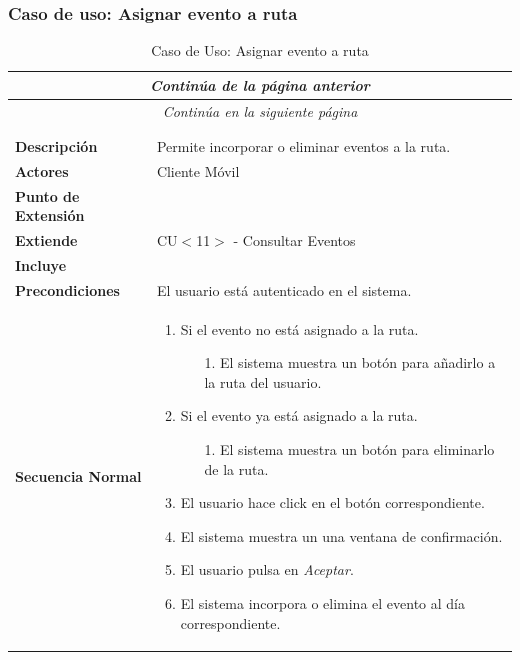 \newpage
\subsubsection*{Caso de uso: Asignar evento a ruta }
\begin{longtable}{| p{4cm} | p{10cm} |}
\endfirsthead
\multicolumn{2}{c}{\textit{Continúa de la página anterior}}\\[12pt]
\hline
\endhead
\hline
\multicolumn{2}{c}{\textit{Continúa en la siguiente página}} \\
\endfoot
\hline
\caption{Caso de Uso: Asignar evento a ruta}\label{fig:1}\\
\endlastfoot


\hline
\multicolumn{2}{|c|}{\textbf{CU$<$13$>$ - Asignar Evento a ruta}} \\

\hline
\textbf{Descripción} &
Permite incorporar o eliminar eventos a la ruta.\\

\hline
\textbf{Actores} &
Cliente Móvil\\

\hline
\textbf{Punto de Extensión} &
\\

\hline
\textbf{Extiende} &
CU$<$11$>$ - Consultar Eventos
\\

\hline
\textbf{Incluye} &
\\

\hline
\textbf{Precondiciones} &
El usuario está autenticado en el sistema.\\

\hline
\textbf{Secuencia Normal} &\mbox{}\par\vspace{-\baselineskip}
\begin{enumerate}[leftmargin=0.7cm, topsep=0.1cm]
\item Si el evento no está asignado a la ruta.
	\begin{itemize}
	\item[1.] El sistema muestra un botón para añadirlo a la ruta del usuario.
	\end{itemize}
\item Si el evento ya está asignado a la ruta.
	\begin{itemize}
	\item[1.] El sistema muestra un botón para eliminarlo de la ruta.
	\end{itemize}
\item El usuario hace click en el botón correspondiente.
\item El sistema muestra un una ventana de confirmación.
\item El usuario pulsa en \textit{Aceptar}.
\item El sistema incorpora o elimina el evento al día correspondiente.
\end{enumerate}



\end{longtable}
